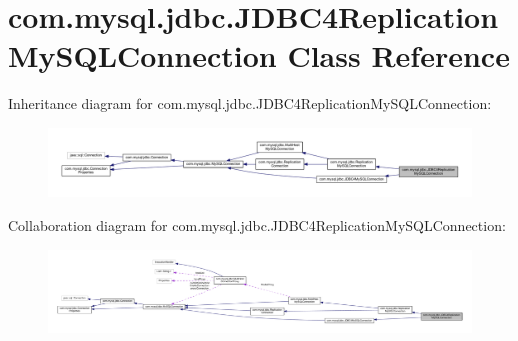 \hypertarget{classcom_1_1mysql_1_1jdbc_1_1_j_d_b_c4_replication_my_s_q_l_connection}{}\section{com.\+mysql.\+jdbc.\+J\+D\+B\+C4\+Replication\+My\+S\+Q\+L\+Connection Class Reference}
\label{classcom_1_1mysql_1_1jdbc_1_1_j_d_b_c4_replication_my_s_q_l_connection}


Inheritance diagram for com.\+mysql.\+jdbc.\+J\+D\+B\+C4\+Replication\+My\+S\+Q\+L\+Connection\+:
\nopagebreak
\begin{figure}[H]
\begin{center}
\leavevmode
\includegraphics[width=350pt]{classcom_1_1mysql_1_1jdbc_1_1_j_d_b_c4_replication_my_s_q_l_connection__inherit__graph}
\end{center}
\end{figure}


Collaboration diagram for com.\+mysql.\+jdbc.\+J\+D\+B\+C4\+Replication\+My\+S\+Q\+L\+Connection\+:
\nopagebreak
\begin{figure}[H]
\begin{center}
\leavevmode
\includegraphics[width=350pt]{classcom_1_1mysql_1_1jdbc_1_1_j_d_b_c4_replication_my_s_q_l_connection__coll__graph}
\end{center}
\end{figure}

